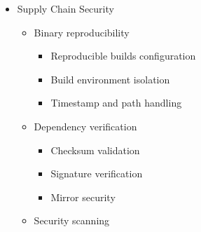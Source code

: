 \documentclass[
]{article}
\providecommand{\tightlist}{%
  \setlength{\itemsep}{0pt}\setlength{\parskip}{0pt}}
\begin{document}
\begin{itemize}
\begin{itemize}
    \begin{itemize}
    \tightlist
    \item
      License tracking

      \begin{itemize}
      \tightlist
      \item
        License manifest generation
      \item
        License compatibility checking
      \item
        Commercial license handling
      \end{itemize}
    \item
      \texttt{SPDX} integration

      \begin{itemize}
      \tightlist
      \item
        \texttt{SBOM} generation
      \item
        Dependency tracking
      \item
        Vulnerability correlation
      \end{itemize}
    \item
      Compliance reporting

      \begin{itemize}
      \tightlist
      \item
        Automated report generation
      \item
        Legal review workflows
      \item
        Archive generation for GPL compliance
      \end{itemize}
    \end{itemize}
  \item
    Supply Chain Security

    \begin{itemize}
    \tightlist
    \item
      Binary reproducibility

      \begin{itemize}
      \tightlist
      \item
        Reproducible builds configuration
      \item
        Build environment isolation
      \item
        Timestamp and path handling
      \end{itemize}
    \item
      Dependency verification

      \begin{itemize}
      \tightlist
      \item
        Checksum validation
      \item
        Signature verification
      \item
        Mirror security
      \end{itemize}
    \item
      Security scanning


\end{itemize}
\end{itemize}
\end{itemize}
\end{document}
